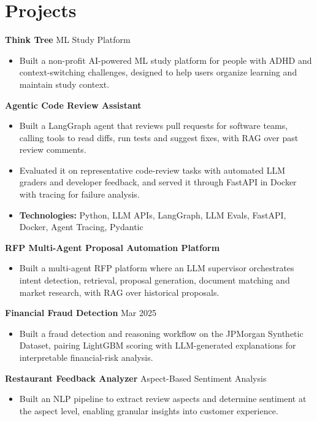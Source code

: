 \documentclass[10pt,a4paper]{article}
\begin{document}
\section{Projects}
\textbf{Think Tree} \textbar{} ML Study Platform\par
\begin{itemize}
  \item Built a non-profit AI-powered ML study platform for people with ADHD and context-switching challenges, designed to help users organize learning and maintain study context.
\end{itemize}
\textbf{Agentic Code Review Assistant}\par
\begin{itemize}
  \item Built a LangGraph agent that reviews pull requests for software teams, calling tools to read diffs, run tests and suggest fixes, with RAG over past review comments.
  \item Evaluated it on representative code-review tasks with automated LLM graders and developer feedback, and served it through FastAPI in Docker with tracing for failure analysis.
  \item \textbf{Technologies:} Python, LLM APIs, LangGraph, LLM Evals, FastAPI, Docker, Agent Tracing, Pydantic
\end{itemize}
\textbf{RFP Multi-Agent Proposal Automation Platform}\par
\begin{itemize}
  \item Built a multi-agent RFP platform where an LLM supervisor orchestrates intent detection, retrieval, proposal generation, document matching and market research, with RAG over historical proposals.
\end{itemize}
\textbf{Financial Fraud Detection} \textbar{} Mar 2025\par
\begin{itemize}
  \item Built a fraud detection and reasoning workflow on the JPMorgan Synthetic Dataset, pairing LightGBM scoring with LLM-generated explanations for interpretable financial-risk analysis.
\end{itemize}
\textbf{Restaurant Feedback Analyzer} \textbar{} Aspect-Based Sentiment Analysis\par
\begin{itemize}
  \item Built an NLP pipeline to extract review aspects and determine sentiment at the aspect level, enabling granular insights into customer experience.
\end{itemize}
\end{document}
